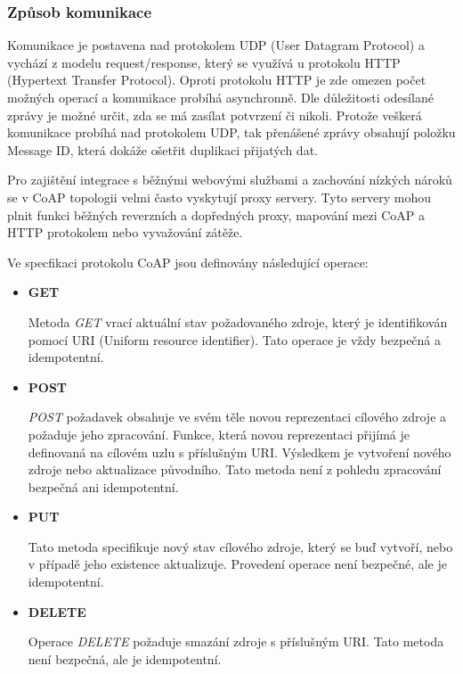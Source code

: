    \subsubsection{Způsob komunikace}
   Komunikace je postavena nad protokolem UDP (User Datagram Protocol) a vychází
   z modelu request/response, který se využívá u protokolu HTTP (Hypertext
   Transfer Protocol). Oproti protokolu HTTP je zde omezen počet možných operací
   a komunikace probíhá asynchronně. Dle důležitosti odesílané zprávy je možné určit,
   zda se má zasílat potvrzení či nikoli. Protože veškerá komunikace probíhá nad
   protokolem UDP, tak přenášené zprávy obsahují položku Message ID, která dokáže
   ošetřit duplikaci přijatých dat.
   
   Pro zajištění integrace s běžnými webovými službami a zachování nízkých nároků
   se v CoAP topologii velmi často vyskytují proxy servery. Tyto servery mohou plnit
   funkci běžných reverzních a dopředných proxy, mapování mezi CoAP a HTTP protokolem
   nebo vyvažování zátěže. 
   
   Ve specfikaci protokolu CoAP jsou definovány následující operace:
   \begin{itemize}
    \item \textbf{GET}
    
    Metoda \textit{GET} vrací aktuální stav požadovaného zdroje, který je identifikován pomocí
    URI (Uniform resource identifier). Tato operace je vždy bezpečná a idempotentní.
    
    \item \textbf{POST}
    
    \textit{POST} požadavek obsahuje ve svém těle novou reprezentaci cílového zdroje a požaduje 
    jeho zpracování. Funkce, která
    novou reprezentaci přijímá je definovaná na cílovém uzlu s příslušným URI.
    Výsledkem je vytvoření nového zdroje nebo aktualizace původního. Tato metoda
    není z pohledu zpracování bezpečná ani idempotentní.
    
    \item \textbf{PUT}
    
    Tato metoda specifikuje nový stav cílového zdroje, který se buď vytvoří, nebo 
    v případě jeho existence aktualizuje. Provedení operace není bezpečné, ale 
    je idempotentní.
    
    \item \textbf{DELETE}
    
    Operace \textit{DELETE} požaduje smazání zdroje s příslušným URI. Tato metoda není bezpečná,
    ale je idempotentní.
    
   \end{itemize}
   
